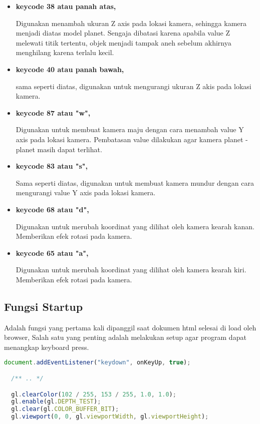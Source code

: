 \begin{itemize}
  \item \textbf{keycode 38 atau panah atas,}

        Digunakan menambah ukuran Z axis pada lokasi kamera, sehingga kamera menjadi diatas model planet. Sengaja dibatasi karena apabila value Z melewati titik tertentu, objek menjadi tampak aneh sebelum akhirnya menghilang karena terlalu kecil.

  \item \textbf{keycode 40 atau panah bawah,}

        sama seperti diatas, digunakan untuk mengurangi ukuran Z akis pada lokasi kamera.

  \item \textbf{keycode 87 atau "w",}

        Digunakan untuk membuat kamera maju dengan cara menambah value Y axis pada lokasi kamera. Pembatasan value dilakukan agar kamera planet - planet masih dapat terlihat.

  \item \textbf{keycode 83 atau "s",}

        Sama seperti diatas, digunakan untuk membuat kamera mundur dengan cara mengurangi value Y axis pada lokasi kamera.

  \item \textbf{keycode 68 atau "d",}

        Digunakan untuk merubah koordinat yang dilihat oleh kamera kearah kanan. Memberikan efek rotasi pada kamera.

  \item \textbf{keycode 65 atau "a",}

        Digunakan untuk merubah koordinat yang dilihat oleh kamera kearah kiri. Memberikan efek rotasi pada kamera.

\end{itemize}

\subsection*{Fungsi Startup}

Adalah fungsi yang pertama kali dipanggil saat dokumen html selesai di load oleh browser,  Salah satu yang penting adalah melakukan setup agar program dapat menangkap keyboard press.

\begin{lstlisting}[language=javascript, label={lst: eventListener}, caption={mengatur eventListener}]
  document.addEventListener("keydown", onKeyUp, true);

  /** .. */

  gl.clearColor(102 / 255, 153 / 255, 1.0, 1.0);
  gl.enable(gl.DEPTH_TEST);
  gl.clear(gl.COLOR_BUFFER_BIT);
  gl.viewport(0, 0, gl.viewportWidth, gl.viewportHeight);
\end{lstlisting}

